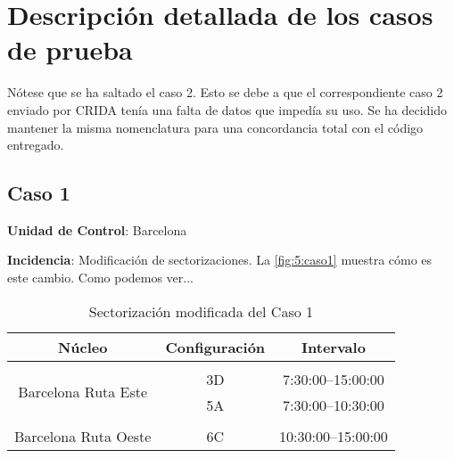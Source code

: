 \section{Descripción detallada de los casos de prueba} \label{Anexo:tabla-casos}

Nótese que se ha saltado el caso 2. Esto se debe a que el correspondiente caso 2 enviado por \gls{CRIDA} tenía una falta de datos que impedía su uso. Se ha decidido mantener la misma nomenclatura para una concordancia total con el código entregado.





\subsection{Caso 1}

\textbf{Unidad de Control}: Barcelona

\textbf{Incidencia}: Modificación de sectorizaciones. La \autoref{fig:5:caso1} muestra cómo es este cambio.
Como podemos ver...



\begin{table}[h]
	\centering
	\caption{Sectorización modificada del Caso 1}
	\begin{tabular}{ccc}
		\hline
		\textbf{Núcleo}                                           & \textbf{Configuración} & \textbf{Intervalo}   \\ \hline
		\multicolumn{1}{l}{}                                      & \multicolumn{1}{l}{}   & \multicolumn{1}{l}{} \\
		\multicolumn{1}{c|}{\multirow{2}{*}{Barcelona Ruta Este}} & 3D                     & 7:30:00--15:00:00    \\
		\multicolumn{1}{c|}{}                                     & 5A                     & 7:30:00--10:30:00    \\
		\multicolumn{1}{l}{}                                      & \multicolumn{1}{l}{}   & \multicolumn{1}{l}{} \\
		Barcelona Ruta Oeste                                      & 6C                     & 10:30:00--15:00:00   \\ \hline
	\end{tabular}
	\label{table:5:caso1-modif}
\end{table}


